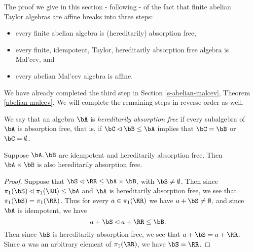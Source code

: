 The proof we give in this section - following \cite{pointing-no-absorption} - of the fact that finite abelian Taylor algebras are affine breaks into three steps:
\begin{itemize}
\item every finite abelian algebra is (hereditarily) absorption free,

\item every finite, idempotent, Taylor, hereditarily absorption free algebra is Mal'cev, and

\item every abelian Mal'cev algebra is affine.
\end{itemize}
We have already completed the third step in Section \ref{s-abelian-malcev}, Theorem \ref{abelian-malcev}. We will complete the remaining steps in reverse order as well.

\begin{defn} We say that an algebra $\bA$ is \emph{hereditarily absorption free} if every subalgebra of $\bA$ is absorption free, that is, if $\bC \lhd \bB \le \bA$ implies that $\bC = \bB$ or $\bC = \emptyset$.
\end{defn}

\begin{prop} Suppose $\bA, \bB$ are idempotent and hereditarily absorption free. Then $\bA \times \bB$ is also hereditarily absorption free.
\end{prop}
\begin{proof} Suppose that $\bS \lhd \RR \le \bA \times \bB$, with $\bS \ne \emptyset$. Then since $\pi_1(\bS) \lhd \pi_1(\RR) \le \bA$ and $\bA$ is hereditarily absorption free, we see that $\pi_1(\bS) = \pi_1(\RR)$. Thus for every $a \in \pi_1(\RR)$ we have $a + \bS \ne \emptyset$, and since $\bA$ is idempotent, we have
\[
a+\bS \lhd a+\RR \le \bB.
\]
Then since $\bB$ is hereditarily absorption free, we see that $a+\bS = a+\RR$. Since $a$ was an arbitrary element of $\pi_1(\RR)$, we have $\bS = \RR$.
\end{proof}

